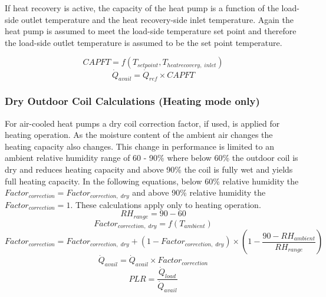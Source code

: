 If heat recovery is active, the capacity of the heat pump is a function of the load-side outlet temperature and the heat recovery-side inlet temperature. Again the heat pump is assumed to meet the load-side temperature set point and therefore the load-side outlet temperature is assumed to be the set point temperature.

\begin{equation}
CAPFT = f(T_{setpoint}, T_{heatrecovery,\; inlet})
\end{equation}
\begin{equation}
\dot{Q}_{avail} = \dot{Q}_{ref} \times CAPFT
\end{equation}

\subsubsection{Dry Outdoor Coil Calculations (Heating mode only)}\label{eir-air-to-water-heat-pumps-dry-coil-calculations}
For air-cooled heat pumps a dry coil correction factor, if used, is applied for heating operation. As the moisture content of the ambient air changes the heating capacity also changes. This change in performance is limited to an ambient relative humidity range of 60 - 90\% where below 60\% the outdoor coil is dry and reduces heating capacity and above 90\% the coil is fully wet and yields full heating capacity. In the following equations, below 60\% relative humidity the $Factor_{correction} = Factor_{correction,\;dry}$ and above 90\% relative humidity the $Factor_{correction} = 1$. These calculations apply only to heating operation.
\begin{equation}
RH_{range} = 90 - 60
\end{equation}
\begin{equation}
Factor_{correction,\;dry} = f(T_{ambient})
\end{equation}
\begin{equation}
Factor_{correction} = Factor_{correction,\;dry} + (1 - Factor_{correction,\;dry}) \times (1 - \frac{90 - RH_{ambient}}{RH_{range}})
\end{equation}
\begin{equation}
\dot{Q}_{avail} = \dot{Q}_{avail} \times Factor_{correction}
\end{equation}
\begin{equation}
PLR = \frac{\dot{Q}_{load}}{\dot{Q}_{avail}}
\end{equation}
